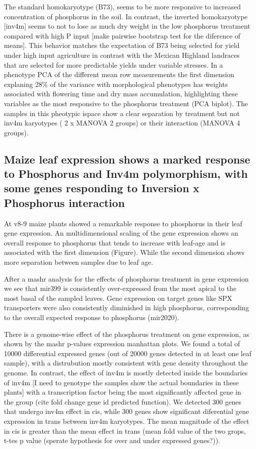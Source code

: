 The standard homokaryotype (B73), seems to be more responsive to increased concentration of phosphorus in the soil. In contrast, the  inverted homokaryotype [inv4m] seems to not to lose as much dry weight in the low phosphorus treatment compared with high P input [make pairwise bootstrap test for the diference of means]. 
This behavior matches the expectation of B73 being selected for yield under high input agriculture in contrast with the Mexican Highland landraces that are selected for more predictable yields under variable stresses. In a phenotype PCA of the different mean row measurements the first dimension explaning 28\% of the variance with morphological phenotypes has weights associated with flowering time and dry mass accumulation, highlighting these variables as the most responsive to the phosphorus treatment (PCA biplot). 
The samples in this pheotypic ispace show a clear separation by treatment  but not  inv4m karyotypes ( 2 x MANOVA 2 groups) or their interaction (MANOVA 4 groups).

\subsection{Maize leaf expression shows a marked response to Phosphorus and Inv4m polymorphism, with some genes responding to Inversion x Phosphorus interaction}

At v8-9 maize plants showed a remarkable response to phosphorus in their leaf gene expression.
An multidimensional scaling of the gene expression shows an overall response to phosphorus that tends to increase with leaf-age and is associated with  the first dimension (Figure). 
While the second dimension shows more separation between samples due to leaf age.

After a mashr analysis for the effects of phosphorus treatment in gene expression we see that mir399 is consistently over-expressed from the most apical to the most basal of the sampled leaves.
Gene expression on target genes like SPX transporters were also consistently diminished in high phosphorus, corresponding to the overall expected response to phosphorus (mir2020).

There is a genome-wise effect of the phosphorus treatment on gene expression, as shown by the mashr p-values {expression manhattan plots}. We found a total of 10000 differential expressed genes (out of 20000 genes detected in at least one leaf sample), with a distrubution mostly consistent with gene density throughout the genome. 
In contrast, the effect of inv4m is mostly detected inside the boundaries of inv4m [I need to genotype the samples  show the actual boundaries  in these plants] with a  transcription factor being the most significantly affected gene in the group (cite fold change gene id predicted function).
We detected 300 genes that undergo inv4m effect in cis, while 300 genes show significant diferential gene expression in trans between inv4m karyotypes.
The mean magnitude of the effect in cis is greater than the mean effect in trans (mean fold value of the two grops, t-tes p value (sperate hypothesis for over and under expressed genes?)).

